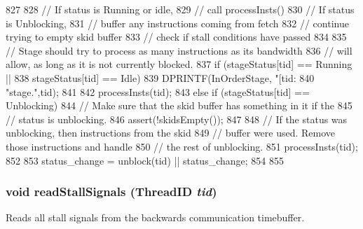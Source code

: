 \begin{DoxyCode}
827 {
828     // If status is Running or idle,
829     //     call processInsts()
830     // If status is Unblocking,
831     //     buffer any instructions coming from fetch
832    //     continue trying to empty skid buffer
833     //     check if stall conditions have passed
834 
835     // Stage should try to process as many instructions as its bandwidth
836     // will allow, as long as it is not currently blocked.
837     if (stageStatus[tid] == Running ||
838         stageStatus[tid] == Idle) {
839         DPRINTF(InOrderStage, "[tid:%
840                 "stage.\n",tid);
841 
842         processInsts(tid);
843     } else if (stageStatus[tid] == Unblocking) {
844         // Make sure that the skid buffer has something in it if the
845         // status is unblocking.
846         assert(!skidsEmpty());
847 
848         // If the status was unblocking, then instructions from the skid
849         // buffer were used.  Remove those instructions and handle
850         // the rest of unblocking.
851         processInsts(tid);
852 
853         status_change = unblock(tid) || status_change;
854     }
855 }
\end{DoxyCode}
\hypertarget{classPipelineStage_ad65c9f053a6038ac8c34c34bfe9a88c3}{
\subsubsection[{readStallSignals}]{\setlength{\rightskip}{0pt plus 5cm}void readStallSignals ({\bf ThreadID} {\em tid})}}
\label{classPipelineStage_ad65c9f053a6038ac8c34c34bfe9a88c3}
Reads all stall signals from the backwards communication timebuffer. 


